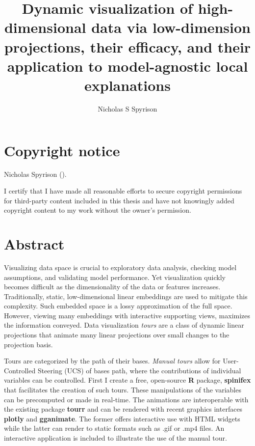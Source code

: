 \documentclass{template/monashthesis}
\author{Nicholas S Spyrison}
\title{Dynamic visualization of high-dimensional data via low-dimension projections, their efficacy, and their application to model-agnostic local explanations}
\begin{document}

\titlepage

{\sf\tighttoc\doublespacing}

\hypertarget{ch-copyright}{%
\chapter*{Copyright notice}\label{ch-copyright}}

\textcopyright { }Nicholas Spyrison (\number\the\year).

I certify that I have made all reasonable efforts to secure copyright permissions for third-party content included in this thesis and have not knowingly added copyright content to my work without the owner's permission.

\newpage

\hypertarget{abstract}{%
\chapter*{Abstract}\label{abstract}}

Visualizing data space is crucial to exploratory data analysis, checking model assumptions, and validating model performance. Yet visualization quickly becomes difficult as the dimensionality of the data or features increases. Traditionally, static, low-dimensional linear embeddings are used to mitigate this complexity. Such embedded space is a lossy approximation of the full space. However, viewing many embeddings with interactive supporting views, maximizes the information conveyed. Data visualization \emph{tours} are a class of dynamic linear projections that animate many linear projections over small changes to the projection basis.

Tours are categorized by the path of their bases. \emph{Manual tours} allow for User-Controlled Steering (UCS) of bases path, where the contributions of individual variables can be controlled. First I create a free, open-source \textbf{R} package, \textbf{spinifex} that facilitates the creation of such tours. These manipulations of the variables can be precomputed or made in real-time. The animations are interoperable with the existing package \textbf{tourr} and can be rendered with recent graphics interfaces \textbf{plotly} and \textbf{gganimate}. The former offers interactive use with HTML widgets while the latter can render to static formats such as .gif or .mp4 files. An interactive application is included to illustrate the use of the manual tour.
\end{document}

